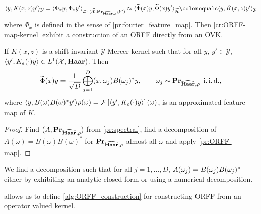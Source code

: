\begin{dmath*}
\inner{y, K(x,z)y'}_{\mathcal{Y}}=\inner{\Phi_x y, \Phi_z y'}_{\mathcal{L^2(\dual{\mathcal{X}},\probability_{\dual{\Haar},\rho};\mathcal{Y'})}}\approx \inner{\tildePhi{\omega}(x)y, \tildePhi{\omega}(x)y'}_{\tildeH{\omega}}\colonequals \inner{y, \tilde{K}(x,z)y'}_{\mathcal{Y}}
\end{dmath*}
where $\Phi_x$ is defined in the sense of \cref{pr:fourier_feature_map}. Then \cref{cr:ORFF-map-kernel} exhibit a construction of an \acs{ORFF} directly from an \acs{OVK}.
\begin{corollary}
\label{cr:ORFF-map-kernel}
If $K(x,z)$ is a shift-invariant $\mathcal{Y}$-Mercer kernel such that for all $y$, $y'\in\mathcal{Y}$, $\langle y', K_e(\cdot)y\rangle\in L^1(\mathcal{X},\mathbf{Haar})$. Then
\begin{equation}
\widetilde{\Phi}(x)y= \frac{1}{\sqrt{D}}\operatorname*{\bigoplus}_{j=1}^D(x, \omega_j)B(\omega_j)^* y, \qquad \omega_j \sim {\mathbf{{Pr}}}_{\widehat{\mathbf{Haar}},\rho} \enskip\text{i.\,i.\,d.},
\end{equation}
where $\langle y, B(\omega)B(\omega)^* y'\rangle\rho(\omega)=\mathcal{F}\left[\langle y', K_e(\cdot)y\rangle\right](\omega)$, is an approximated feature map of $K$.
\end{corollary}
\begin{proof}
Find $(A, {\mathbf{{Pr}}}_{\widehat{\mathbf{Haar}},\rho})$ from \cref{pr:spectral}, find a decomposition of $A(\omega)=B(\omega)B(\omega)^*$ for ${\mathbf{{Pr}}}_{\widehat{\mathbf{Haar}},\rho}$-almost all $\omega$ and apply \cref{pr:ORFF-map}.
\end{proof}
\begin{remark}
We find a decomposition such that for all $j=1, \ldots, D$, $A(\omega_j)=B(\omega_j)B(\omega_j)^* $ either by exhibiting an analytic closed-form or using a numerical decomposition.
\end{remark}
 allows us to define \cref{alg:ORFF_construction} for constructing \acs{ORFF} from an operator valued kernel.
